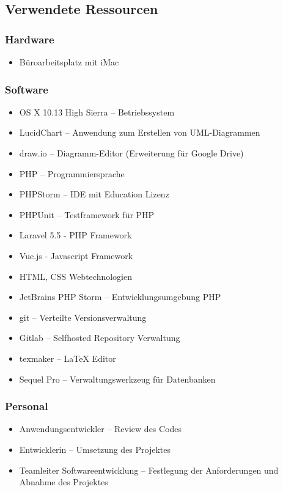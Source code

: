 \subsection{Verwendete Ressourcen}
\label{app:Ressourcen}

\subsubsection{Hardware}
\begin{itemize}
	\item Büroarbeitsplatz mit iMac
\end{itemize}

\subsubsection{Software}
\begin{itemize}
	\item OS X 10.13 High Sierra – Betriebssystem
	\item LucidChart – Anwendung zum Erstellen von \acs{UML}-Diagrammen
	\item draw.io – Diagramm-Editor (Erweiterung für Google Drive)
	\item PHP – Programmiersprache
	\item PHPStorm – IDE mit Education Lizenz
	\item PHPUnit – Testframework für PHP
	\item Laravel 5.5 - \acs{PHP} Framework
	\item Vue.js - Javascript Framework
	\item \acs{HTML}, \acs{CSS} Webtechnologien
	\item JetBrains PHP Storm – Entwicklungsumgebung \acs{PHP}
	\item git – Verteilte Versionsverwaltung
	\item Gitlab – Selfhosted Repository Verwaltung
	\item texmaker – \LaTeX\xspace Editor
	\item Sequel Pro – Verwaltungswerkzeug für Datenbanken
\end{itemize}

\subsubsection{Personal}
\begin{itemize}
	\item Anwendungsentwickler – Review des Codes
	\item Entwicklerin – Umsetzung des Projektes
	\item Teamleiter Softwareentwicklung – Festlegung der Anforderungen und Abnahme des Projektes
\end{itemize}